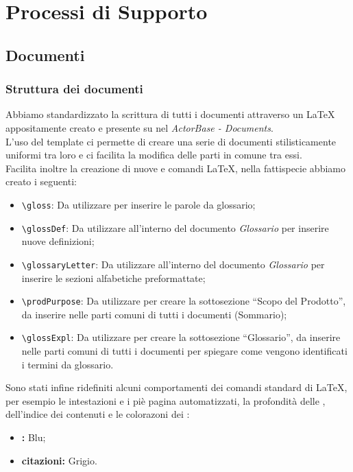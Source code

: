 \documentclass{scalatekids-article}
\begin{document}
\section{Processi di Supporto}
\subsection{Documenti}
\subsubsection{Struttura dei documenti}
\label{sec:strutturadoc}
Abbiamo standardizzato la scrittura di tutti i documenti attraverso un
 \LaTeX\xspace appositamente creato e presente su
\textit{} nel  \textit{ActorBase -
  Documents}.\\ L'uso del template ci permette di creare una serie di documenti
stilisticamente uniformi tra loro e ci facilita la modifica delle parti in
comune tra essi.\\Facilita inoltre la creazione di nuove  e comandi
\LaTeX\xspace, nella fattispecie abbiamo creato i seguenti:
\begin{itemize}
\item\verb=\gloss=: Da utilizzare per inserire le parole da glossario;
\item\verb=\glossDef=: Da utilizzare all'interno del documento \textit{Glossario} per inserire nuove definizioni;
\item\verb=\glossaryLetter=: Da utilizzare all'interno del documento \textit{Glossario} per inserire le sezioni alfabetiche preformattate;
\item\verb=\prodPurpose=: Da utilizzare per creare la sottosezione ``Scopo del Prodotto'', da inserire nelle parti comuni di tutti i documenti (Sommario);
\item\verb=\glossExpl=: Da utilizzare per creare la sottosezione ``Glossario'', da inserire nelle parti comuni di tutti i documenti per spiegare come vengono identificati i termini da glossario.
\end{itemize}
Sono stati infine ridefiniti alcuni comportamenti dei comandi standard di
\LaTeX\xspace, per esempio le intestazioni e i piè pagina automatizzati, la
profondità delle , dell'indice dei contenuti e le colorazoni dei
:
\begin{itemize}
\item\textbf{:} Blu;
\item\textbf{citazioni:} Grigio.
\end{itemize}
\end{document}
